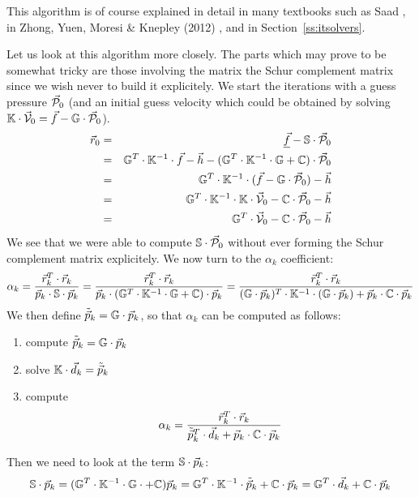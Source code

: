 This algorithm is of course explained in detail in many textbooks such as Saad \cite{saad},
in Zhong, Yuen, Moresi \& Knepley (2012) \cite{zhym12}, and in Section~\ref{ss:itsolvers}.

Let us look at this algorithm more closely. The parts which may prove to be somewhat tricky 
are those involving the matrix the Schur complement matrix since we wish never to build 
it explicitely. We start the iterations with a guess pressure $\vec{\cal P}_0$ (and an initial guess velocity 
which could be obtained by 
solving ${\mathbb{K}}\cdot \vec{\cal V}_0 =\vec{f}- {\mathbb{G}}\cdot \vec{\cal P}_0$).
\begin{eqnarray}
\vec{r}_0 
&=& \underline{\vec{f}}-{\mathbb{S}} \cdot \vec{\cal P}_0 \\
&=& {\mathbb{G}}^T\cdot {\mathbb{K}}^{-1}\cdot \vec{f} - \vec{h} - ({\mathbb{G}}^T\cdot {\mathbb{K}}^{-1}\cdot {\mathbb{G}} + {\mathbb{C}})\cdot \vec{\cal P}_0 \\ 
&=& {\mathbb{G}}^T\cdot {\mathbb{K}}^{-1}\cdot (\vec{f} - {\mathbb{G}}\cdot \vec{\cal P}_0) - \vec{h} \\
&=& {\mathbb{G}}^T\cdot {\mathbb{K}}^{-1}\cdot {\mathbb{K}}\cdot \vec{\cal V}_0 -{\mathbb{C}} \cdot \vec{\cal P}_0 - \vec{h} \\ 
&=& {\mathbb{G}}^T\cdot \vec{\cal V}_0  -{\mathbb{C}} \cdot \vec{\cal P}_0   - \vec{h} 
\end{eqnarray}
We see that we were able to compute ${\mathbb{S}} \cdot \vec{\cal P}_0$ without ever forming the 
Schur complement matrix explicitely. We now turn to the $\alpha_k$ coefficient:
\[
\alpha_k 
= \frac{\vec{r}_k^T\cdot \vec{r}_k }{\vec{p}_k \cdot {\mathbb{S}}\cdot  \vec{p}_k } 
= \frac{\vec{r}_k^T \cdot \vec{r}_k }{\vec{p}_k\cdot ({\mathbb{G}}^T \cdot {\mathbb{K}}^{-1} \cdot {\mathbb{G}} +{\mathbb{C}} )\cdot \vec{p}_k } 
= \frac{\vec{r}_k^T \cdot \vec{r}_k }{({\mathbb{G}}\cdot \vec{p}_k)^T \cdot  {\mathbb{K}}^{-1} \cdot ({\mathbb{G}} \cdot \vec{p}_k) + \vec{p}_k\cdot {\mathbb{C}}\cdot \vec{p}_k } 
\]
We then define $\tilde{\vec{p}}_k = {\mathbb{G}} \cdot \vec{p}_k$, so that $\alpha_k$ can be computed as follows:
\begin{enumerate}
\item compute $\tilde{\vec{p}}_k = {\mathbb{G}} \cdot  \vec{p}_k$
\item solve ${\mathbb{K}}\cdot  \vec{d}_k = \tilde{\vec{p}}_k$
\item compute 
\[
\alpha_k=\frac{\vec{r}_k^T \cdot \vec{r}_k}{\tilde{\vec{p}}_k^T \cdot \vec{d}_k 
+ \vec{p}_k\cdot {\mathbb{C}}\cdot \vec{p}_k }
\]
\end{enumerate}
Then we need to look at the term ${\mathbb{S}}\cdot \vec{p}_k$:
\[
{\mathbb{S}}\cdot \vec{p}_k = ({\mathbb{G}}^T\cdot {\mathbb{K}}^{-1}\cdot {\mathbb{G}}\cdot +{\mathbb{C}} )\vec{p}_k 
= {\mathbb{G}}^T\cdot {\mathbb{K}}^{-1}\cdot \tilde{\vec{p}}_k  + {\mathbb{C}}\cdot \vec{p}_k= {\mathbb{G}}^T\cdot  \vec{d}_k + {\mathbb{C}} \cdot \vec{p}_k
\]

